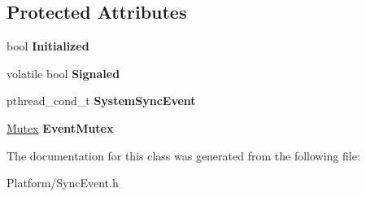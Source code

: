 \subsection*{Protected Attributes}
\begin{DoxyCompactItemize}
\item 
\mbox{\label{class_gost_crypt_1_1_sync_event_a35d11647c584146438d286e60fdf666c}} 
bool {\bfseries Initialized}
\item 
\mbox{\label{class_gost_crypt_1_1_sync_event_a837ece69f7c67c5711d7c0bf271a4571}} 
volatile bool {\bfseries Signaled}
\item 
\mbox{\label{class_gost_crypt_1_1_sync_event_aae96777dab8f68352ab14599f18f5654}} 
pthread\+\_\+cond\+\_\+t {\bfseries System\+Sync\+Event}
\item 
\mbox{\label{class_gost_crypt_1_1_sync_event_ae2e7a9719252232458d491423919539e}} 
\hyperlink{class_gost_crypt_1_1_mutex}{Mutex} {\bfseries Event\+Mutex}
\end{DoxyCompactItemize}


The documentation for this class was generated from the following file\+:\begin{DoxyCompactItemize}
\item 
Platform/Sync\+Event.\+h\end{DoxyCompactItemize}
